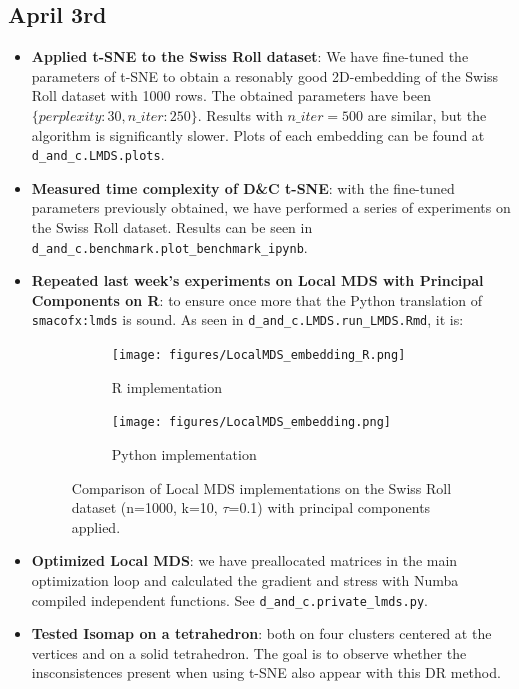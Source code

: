 \documentclass[a4paper,12pt]{article}
\begin{document}
\subsection{April 3rd}
\begin{itemize}
    \item \textbf{Applied t-SNE to the Swiss Roll dataset}: We have fine-tuned the parameters of t-SNE to obtain a resonably good 2D-embedding of the Swiss Roll dataset with 1000 rows. The obtained parameters have been $\{perplexity:30, n\_iter:250\}$. Results with $n\_iter = 500$ are similar, but the algorithm is significantly slower. Plots of each embedding can be found at \verb|d_and_c.LMDS.plots|.
    \item \textbf{Measured time complexity of D\&C t-SNE}: with the fine-tuned parameters previously obtained, we have performed a series of experiments on the Swiss Roll dataset. Results can be seen in \verb|d_and_c.benchmark.plot_benchmark_ipynb|.
    \item \textbf{Repeated last week's experiments on Local MDS with Principal Components on R}: to ensure once more that the Python translation of \verb|smacofx:lmds| is sound. As seen in \verb|d_and_c.LMDS.run_LMDS.Rmd|, it is:

    \begin{figure}[H]
        \centering
        \begin{subfigure}[b]{0.75\textwidth}
            \centering
            \texttt{[image: figures/LocalMDS\_embedding\_R.png]}
            \caption{R implementation}
            \label{fig:lmds_R}
        \end{subfigure}
        
        \vspace{1cm}
        
        \begin{subfigure}[b]{0.75\textwidth}
            \centering
            \texttt{[image: figures/LocalMDS\_embedding.png]}
            \caption{Python implementation}
            \label{fig:lmds_python}
        \end{subfigure}
        \caption{Comparison of Local MDS implementations on the Swiss Roll dataset (n=1000, k=10, $\tau$=0.1) with principal components applied.}
        \label{fig:lmds_comparison}
    \end{figure}

    \item \textbf{Optimized Local MDS}: we have preallocated matrices in the main optimization loop and calculated the gradient and stress with Numba compiled independent functions. See \verb|d_and_c.private_lmds.py|.
    \item \textbf{Tested Isomap on a tetrahedron}: both on four clusters centered at the vertices and on a solid tetrahedron. The goal is to observe whether the insconsistences present when using t-SNE also appear with this DR method.
    

\end{itemize}
\end{document}
